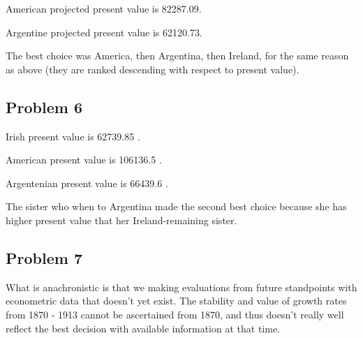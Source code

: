 \documentclass[12pt,letterpaper]{article}
\theoremstyle{definition}
\begin{document}
American projected present value is 82287.09.

Argentine projected present value is 62120.73.

The best choice was America, then Argentina, then Ireland, for the same reason
as above (they are ranked descending with respect to present value).

\subsection*{Problem 6}

Irish present value is 62739.85 .

American present value is 106136.5 .

Argentenian present value is 66439.6 .

The sister who when to Argentina made the second best choice because she has
higher present value that her Ireland-remaining sister.

\subsection*{Problem 7}

What is anachronistic is that we making evaluations from future
standpoints with econometric data that doesn't yet exist. The stability and
value of growth rates from 1870 - 1913 cannot be ascertained from 1870, and thus
doesn't really well reflect the best decision with available information at that time.
\end{document}
